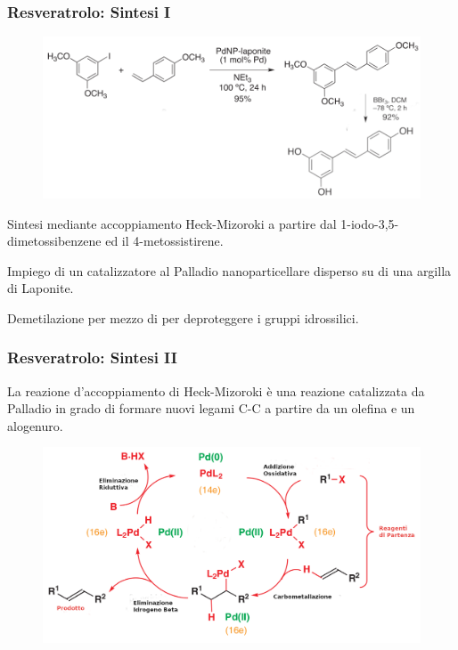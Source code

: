 \documentclass[9pt]{beamer}
\begin{document}
\begin{frame}
	\frametitle{Resveratrolo: Sintesi I}
	\begin{figure}
		\includegraphics{immagini/totale_resveratrolo.png}
	\end{figure}
	Sintesi mediante accoppiamento Heck-Mizoroki a partire dal 1-iodo-3,5-dimetossibenzene ed il 4-metossistirene.
	
	Impiego di un catalizzatore al Palladio nanoparticellare disperso su di una argilla di Laponite.
	
	Demetilazione per mezzo di  per deproteggere i gruppi idrossilici.
	
\end{frame}

\begin{frame}
	\frametitle{Resveratrolo: Sintesi II}
	\bigskip
	La reazione d'accoppiamento di Heck-Mizoroki è una reazione catalizzata da Palladio in grado di formare nuovi legami C-C a partire da un olefina e un alogenuro.
	
	\begin{figure}
		\centering
		\includegraphics[width=\textwidth]{immagini/heck.png}
	\end{figure}
\end{frame}
\end{document}
